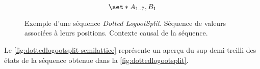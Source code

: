 \begin{figure}[tb]
\centering
\begin{subfigure}[b]{0.69\linewidth}
    \centering
    \caption{}\label{fig:dottedlogootsplit-1}
\end{subfigure}
\begin{subfigure}[b]{0.29\linewidth}
    \centering
    \begin{equation*}
        \set*{A_{\irange{1}{7}},B_1}
    \end{equation*}
    \caption{}\label{fig:dottedlogootsplit-2}
\end{subfigure}
\caption[Exemple d'une séquence \emph{Dotted LogootSplit}]{Exemple d'une séquence \emph{Dotted LogootSplit}.
 Séquence de valeurs associées à leurs positions.
 Contexte causal de la séquence.}\label{fig:dottedlogootsplit}
\end{figure}

Le \autoref{fig:dottedlogootsplit-semilattice} représente un aperçu du sup-demi-treilli des états de la séquence obtenue dans la \autoref{fig:dottedlogootsplit}.

